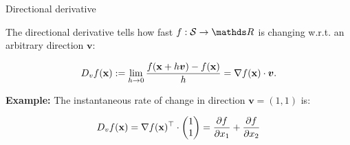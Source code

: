 \begin{vbframe}{Directional derivative}

The directional derivative tells how fast $f: \mathcal{S} \to \R$ is changing w.r.t. an arbitrary direction $\bm{v}$: 

 $$
   D_v f(\mathbf{x}) := \lim_{h \to 0} \frac{f(\mathbf{x} + h \bm v) - f(\mathbf{x})}{h} = \nabla f(\mathbf{x}) \cdot \bm v. 
 $$

 
\textbf{Example: } The instantaneous rate of change in direction $\bm{v} = (1, 1)$ is:

$$
D_v f(\mathbf{x}) = \nabla f(\mathbf{x})^\top \cdot \begin{pmatrix} 1 \\1\end{pmatrix} = \frac{\partial f}{\partial x_1} + \frac{\partial f}{\partial x_2}
$$

\end{vbframe}

